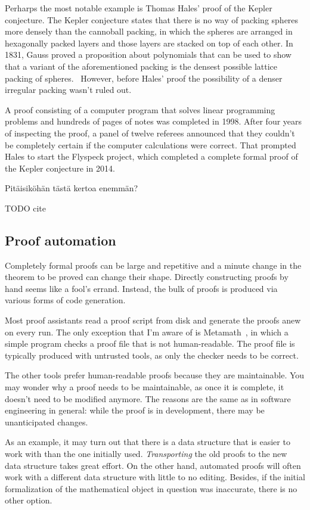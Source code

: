 \documentclass[english, 12pt, a4paper, sci, a-1b, online]{aaltothesis}
\begin{document}
Perharps the most notable example is Thomas Hales' proof of the Kepler conjecture. The Kepler conjecture states that there is no way of packing spheres more densely than the cannoball packing, in which the spheres are arranged in hexagonally packed layers and those layers are stacked on top of each other. In 1831, Gauss proved a proposition about polynomials that can be used to show that a variant of the aforementioned packing is the densest possible lattice packing of spheres.~\cite{dichteste} However, before Hales' proof the possibility of a denser irregular packing wasn't ruled out.

A proof consisting of a computer program that solves linear programming problems and hundreds of pages of notes was completed in 1998. After four years of inspecting the proof, a panel of twelve referees announced that they couldn't be completely certain if the computer calculations were correct. That prompted Hales to start the Flyspeck project, which completed a complete formal proof of the Kepler conjecture in 2014.

Pitäisiköhän tästä kertoa enemmän?

TODO cite

\subsection{Proof automation}

Completely formal proofs can be large and repetitive and a minute change in the theorem to be proved can change their shape. Directly constructing proofs by hand seems like a fool's errand. Instead, the bulk of proofs is produced via various forms of code generation.

Most proof assistants read a proof script from disk and generate the proofs anew on every run. The only exception that I'm aware of is Metamath~\cite{MMZero}, in which a simple program checks a proof file that is not human-readable. The proof file is typically produced with untrusted tools, as only the checker needs to be correct.

The other tools prefer human-readable proofs because they are maintainable. You may wonder why a proof needs to be maintainable, as once it is complete, it doesn't need to be modified anymore. The reasons are the same as in software engineering in general: while the proof is in development, there may be unanticipated changes.

As an example, it may turn out that there is a data structure that is easier to work with than the one initially used. \emph{Transporting} the old proofs to the new data structure takes great effort. On the other hand, automated proofs will often work with a different data structure with little to no editing. Besides, if the initial formalization of the mathematical object in question was inaccurate, there is no other option.
\end{document}
